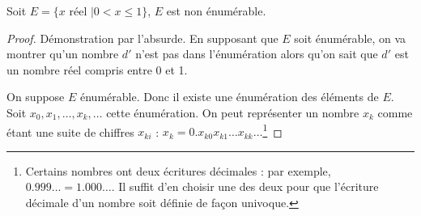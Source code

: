 \begin{mytheo}
	Soit $E = \{ x \text{ réel }| 0<x\leq1\}$, $E$ est non énumérable.

	\begin{proof}
		Démonstration par l'absurde.  En supposant que $E$ soit énumérable, on va montrer qu'un nombre $d'$ n'est pas dans l'énumération alors qu'on sait
		que $d'$ est un nombre réel compris entre 0 et 1.

		On suppose $E$ énumérable. Donc il existe une énumération des éléments de $E$.  Soit
		$x_0, x_1,\dots,x_k,\dots$ cette énumération. On peut représenter un nombre $x_k$ comme étant une
		suite de chiffres $x_{ki}$ : $x_k = 0.x_{k0}x_{k1}\dots x_{kk}\dots$\footnote{Certains nombres ont deux écritures décimales : par exemple, $0.999\ldots = 1.000\ldots$. Il suffit d'en choisir une des deux pour que l'écriture décimale d'un nombre soit définie de façon univoque.}


\end{proof}
\end{mytheo}
